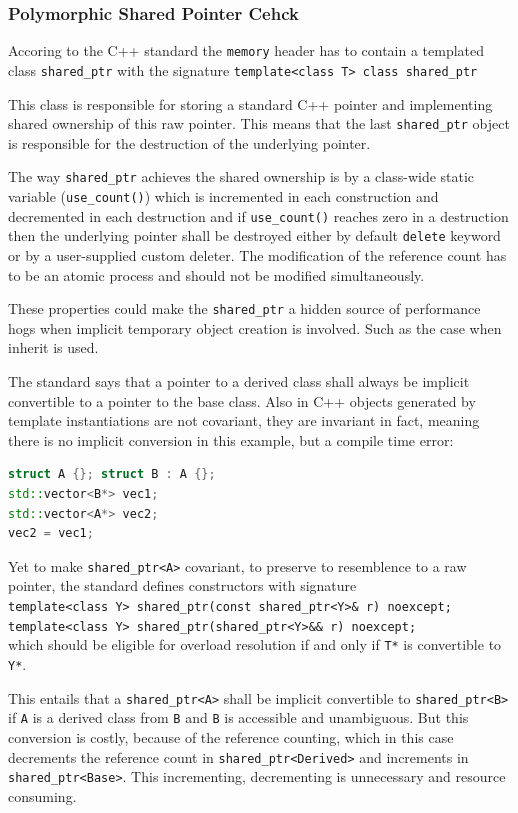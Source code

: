 \subsubsection{Polymorphic Shared Pointer Cehck}
\par Accoring to the C++ standard the \verb|memory| header has to contain a templated class \verb|shared_ptr| with the signature \verb|template<class T> class shared_ptr|\cite[\S20.8.2.2]{cpp_standard} \medskip
\par This class is responsible for storing a standard C++ pointer and implementing shared ownership of this raw pointer. This means that the last \verb|shared_ptr| object is responsible for the destruction of the underlying pointer. \medskip
\par The way \verb|shared_ptr| achieves the shared ownership is by a class-wide static variable (\verb|use_count()|) which is incremented in each construction and decremented in each destruction and if \verb|use_count()|  reaches zero in a destruction then the underlying pointer shall be destroyed either by default \verb|delete| keyword or by a user-supplied custom deleter. The modification of the reference count has to be an atomic process and should not be modified simultaneously\cite[\S20.8.2.2 4.]{cpp_standard}. \medskip
\par These properties could make the \verb|shared_ptr| a hidden source of performance hogs when implicit temporary object creation is involved.  Such as the case when inherit is used. \medskip
\par The standard says that a pointer to a derived class shall always be implicit convertible to a pointer to the base class\cite[\S4.10 3.]{cpp_standard}. Also in C++ objects generated  by template instantiations are not covariant, they are invariant in fact, meaning there is no implicit conversion in this example, but a compile time error:
 \begin{lstlisting}[language=c++, frame=single]
struct A {}; struct B : A {};
std::vector<B*> vec1;
std::vector<A*> vec2;
vec2 = vec1;
\end{lstlisting}
\par Yet to make \verb|shared_ptr<A>| covariant, to preserve to resemblence to a raw pointer, the standard defines constructors with signature 
\\ \verb|template<class Y> shared_ptr(const shared_ptr<Y>& r) noexcept;|\\ 
\verb|template<class Y> shared_ptr(shared_ptr<Y>&& r) noexcept;| \\
\cite[\S20.8.2.2.1]{cpp_standard}
 which should be eligible for overload resolution if and only  if \verb|T*| is convertible to \verb|Y*|. \medskip
 \par This entails that a \verb|shared_ptr<A>| shall be implicit convertible to \verb|shared_ptr<B>| if \verb|A| is a derived class from \verb|B| and \verb|B| is accessible and unambiguous. But this conversion is costly, because of the reference counting, which in this case decrements the reference count in \verb|shared_ptr<Derived>| and increments in \verb|shared_ptr<Base>|. This incrementing, decrementing is unnecessary and resource consuming.
